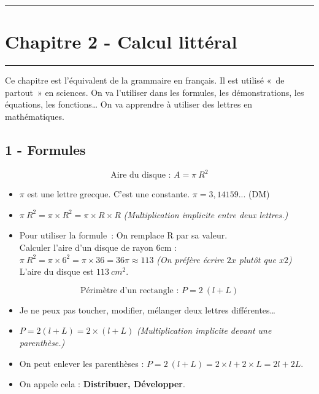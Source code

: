 \documentclass[11pt]{article}
\newcommand{\horrule}[1]{\rule{\linewidth}{#1}} %
\begin{document}

\newtheorem{Definition}{Définition}
\newtheorem{Theorem}{Théorème}
\newtheorem{Proposition}{Propriété}

\renewcommand{\labelitemi}{$\bullet$}
\renewcommand{\labelitemii}{$\circ$}

\setlength{\columnseprule}{1pt}

\horrule{2px}
\section*{Chapitre 2 - Calcul littéral}
\horrule{2px}


Ce chapitre est l’équivalent de la grammaire en français. Il est utilisé « de partout » en sciences. On va l’utiliser dans les formules, les démonstrations, les équations, les fonctions… On va apprendre à utiliser des lettres en mathématiques.

\subsection*{1 - Formules}

$$\text{Aire du disque : }A = \pi ~ R^2$$

\begin{itemize}
  \item $\pi$ est une lettre grecque. C’est une constante. $\pi = 3,14159 ...$ (DM)
  \item $\pi ~ R^2 = \pi \times R^2 = \pi \times R \times R $ \textit{(Multiplication implicite entre deux lettres.)}
  \item Pour utiliser la formule : On remplace R par sa valeur. \\
  Calculer l'aire d'un disque de rayon 6cm :\\
  $\pi ~ R^2 = \pi \times 6^2 =\pi \times 36 = 36\pi \approx 113$ \textit{(On préfère écrire $2x$ plutôt que $x2$)} \\
  L'aire du disque est $113 ~ cm^2$.
 \end{itemize} 

 $$\text{Périmètre d’un rectangle : }P = 2 ~ (l + L)$$
\begin{itemize}
  \item Je ne peux pas toucher, modifier, mélanger deux lettres différentes…
  \item $P = 2(l + L) = 2 \times (l + L)$ \textit{(Multiplication implicite devant une parenthèse.)}
  \item On peut enlever les parenthèses : $P = 2 ~ (l + L) = 2\times l + 2\times L = 2l + 2L$.
  \item On appele cela : \textbf{Distribuer, Développer}.
 \end{itemize}
\end{document}
